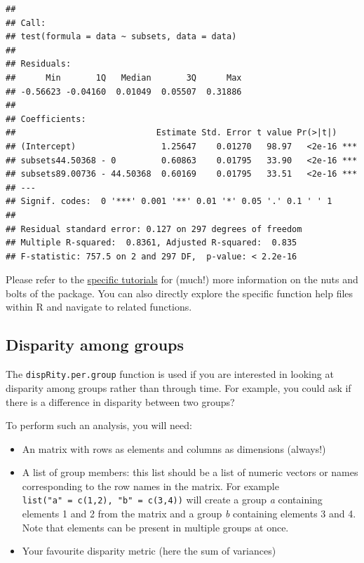 \documentclass[]{book}
\providecommand{\tightlist}{%
  \setlength{\itemsep}{0pt}\setlength{\parskip}{0pt}}
\theoremstyle{definition}
\theoremstyle{definition}
\theoremstyle{remark}
\begin{document}
\begin{verbatim}
## 
## Call:
## test(formula = data ~ subsets, data = data)
## 
## Residuals:
##      Min       1Q   Median       3Q      Max 
## -0.56623 -0.04160  0.01049  0.05507  0.31886 
## 
## Coefficients:
##                            Estimate Std. Error t value Pr(>|t|)    
## (Intercept)                 1.25647    0.01270   98.97   <2e-16 ***
## subsets44.50368 - 0         0.60863    0.01795   33.90   <2e-16 ***
## subsets89.00736 - 44.50368  0.60169    0.01795   33.51   <2e-16 ***
## ---
## Signif. codes:  0 '***' 0.001 '**' 0.01 '*' 0.05 '.' 0.1 ' ' 1
## 
## Residual standard error: 0.127 on 297 degrees of freedom
## Multiple R-squared:  0.8361, Adjusted R-squared:  0.835 
## F-statistic: 757.5 on 2 and 297 DF,  p-value: < 2.2e-16
\end{verbatim}

Please refer to the \protect\hyperlink{specific-tutorial}{specific
tutorials} for (much!) more information on the nuts and bolts of the
package. You can also directly explore the specific function help files
within R and navigate to related functions.

\hypertarget{disparity-among-groups}{\subsection{Disparity among
groups}\label{disparity-among-groups}}

The \texttt{dispRity.per.group} function is used if you are interested
in looking at disparity among groups rather than through time. For
example, you could ask if there is a difference in disparity between two
groups?

To perform such an analysis, you will need:

\begin{itemize}
\tightlist
\item
  An matrix with rows as elements and columns as dimensions (always!)
\item
  A list of group members: this list should be a list of numeric vectors
  or names corresponding to the row names in the matrix. For example
  \texttt{list("a"\ =\ c(1,2),\ "b"\ =\ c(3,4))} will create a group
  \emph{a} containing elements 1 and 2 from the matrix and a group
  \emph{b} containing elements 3 and 4. Note that elements can be
  present in multiple groups at once.
\item
  Your favourite disparity metric (here the sum of variances)
\end{itemize}
\end{document}
